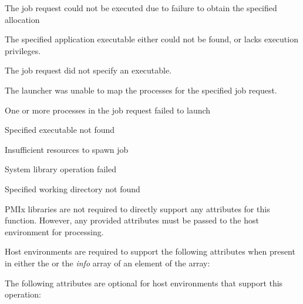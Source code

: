 \returnstart
\begin{constantdesc}
\item {} The job request could not be executed due to failure to obtain the specified allocation
\item {} The specified application executable either could not be found, or lacks execution privileges.
\item {} The job request did not specify an executable.
\item {} The launcher was unable to map the processes for the specified job request.
\item {} One or more processes in the job request failed to launch
\item {} Specified executable not found
\item {} Insufficient resources to spawn job
\item {} System library operation failed
\item {} Specified working directory not found
\end{constantdesc}
\returnend

\reqattrstart
\ac{PMIx} libraries are not required to directly support any attributes for this function. However, any provided attributes must be passed to the host environment for processing.

Host environments are required to support the following attributes when present in either the  or the \textit{info} array of an element of the  array:


\reqattrend

\optattrstart
The following attributes are optional for host environments that support this operation:

